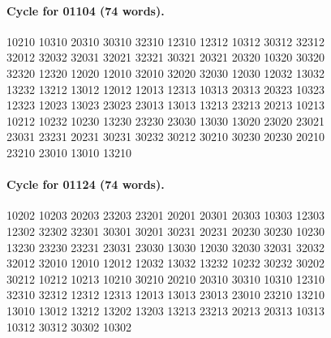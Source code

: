 \documentclass[11pt]{article}
\theoremstyle{remark}
\numberwithin{equation}{section}
\numberwithin{table}{section}
\begin{document}
\paragraph{Cycle for 01104 (74 words).}
\begingroup\footnotesize\ttfamily\begin{flushleft}
10210 10310 20310 30310 32310 12310 12312 10312 30312 32312\\
32012 32032 32031 32021 32321 30321 20321 20320 10320 30320\\
32320 12320 12020 12010 32010 32020 32030 12030 12032 13032\\
13232 13212 13012 12012 12013 12313 10313 20313 20323 10323\\
12323 12023 13023 23023 23013 13013 13213 23213 20213 10213\\
10212 10232 10230 13230 23230 23030 13030 13020 23020 23021\\
23031 23231 20231 30231 30232 30212 30210 30230 20230 20210\\
23210 23010 13010 13210\\
\end{flushleft}\endgroup
\paragraph{Cycle for 01124 (74 words).}
\begingroup\footnotesize\ttfamily\begin{flushleft}
10202 10203 20203 23203 23201 20201 20301 20303 10303 12303\\
12302 32302 32301 30301 30201 30231 20231 20230 30230 10230\\
13230 23230 23231 23031 23030 13030 12030 32030 32031 32032\\
32012 32010 12010 12012 12032 13032 13232 10232 30232 30202\\
30212 10212 10213 10210 30210 20210 20310 30310 10310 12310\\
32310 32312 12312 12313 12013 13013 23013 23010 23210 13210\\
13010 13012 13212 13202 13203 13213 23213 20213 20313 10313\\
10312 30312 30302 10302\\
\end{flushleft}\endgroup
\end{document}
